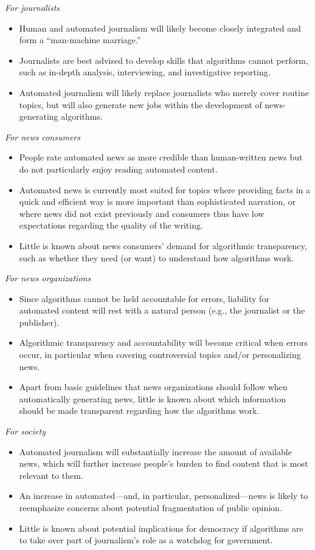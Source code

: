 \documentclass[notoc, symmetric, nobib, nols]{towcenter-book}
\begin{document}
\textit{For journalists}
\begin{itemize}
\item Human and automated journalism will likely become closely integrated and form a “man-machine marriage.” 
\item Journalists are best advised to develop skills that algorithms cannot perform, such as in-depth analysis, interviewing, and investigative reporting. 
\item Automated journalism will likely replace journalists who merely cover routine topics, but will also generate new jobs within the development of news-generating algorithms. 
\end{itemize}

\textit{For news consumers}
\begin{itemize}
\item People rate automated news as more credible than human-written news but do not particularly enjoy reading automated content.
\item Automated news is currently most suited for topics where providing facts in a quick and efficient way is more important than sophisticated narration, or where news did not exist previously and consumers thus have low expectations regarding the quality of the writing. 
\item Little is known about news consumers’ demand for algorithmic transparency, such as whether they need (or want) to understand how algorithms work. 
\end{itemize}

\textit{For news organizations}
\begin{itemize}
\item Since algorithms cannot be held accountable for errors, liability for automated content will rest with a natural person (e.g., the journalist or the publisher).
\item Algorithmic transparency and accountability will become critical when errors occur, in particular when covering controversial topics and/or personalizing news.
\item Apart from basic guidelines that news organizations should follow when automatically generating news, little is known about which information should be made transparent regarding how the algorithms work. 
\end{itemize}

\textit{For society}
\begin{itemize}
\item Automated journalism will substantially increase the amount of available news, which will further increase people’s burden to find content that is most relevant to them. 
\item An increase in automated---and, in particular, personalized---news is likely to reemphasize concerns about potential fragmentation of public opinion.
\item Little is known about potential implications for democracy if algorithms are to take over part of journalism’s role as a watchdog for government.  
\end{itemize}
\end{document}
